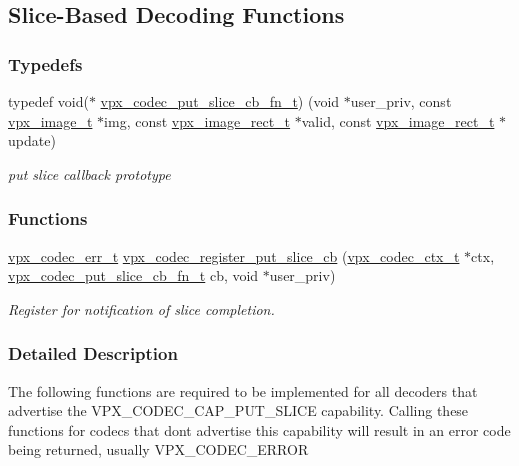 \hypertarget{group__cap__put__slice}{}\subsection{Slice-\/\+Based Decoding Functions}
\label{group__cap__put__slice}
\subsubsection*{Typedefs}
\begin{DoxyCompactItemize}
\item 
typedef void($\ast$ \hyperlink{group__cap__put__slice_gaab464940e2102efa0604b7788eb2e3b1}{vpx\+\_\+codec\+\_\+put\+\_\+slice\+\_\+cb\+\_\+fn\+\_\+t}) (void $\ast$user\+\_\+priv, const \hyperlink{vpx__image_8h_abf5ac962cc6d71b4f0e39b1b0d033e55}{vpx\+\_\+image\+\_\+t} $\ast$img, const \hyperlink{vpx__image_8h_aba8af9e601eb9c3c41431d0f4fef65a6}{vpx\+\_\+image\+\_\+rect\+\_\+t} $\ast$valid, const \hyperlink{vpx__image_8h_aba8af9e601eb9c3c41431d0f4fef65a6}{vpx\+\_\+image\+\_\+rect\+\_\+t} $\ast$update)
\begin{DoxyCompactList}\small\item\em put slice callback prototype \end{DoxyCompactList}\end{DoxyCompactItemize}
\subsubsection*{Functions}
\begin{DoxyCompactItemize}
\item 
\hyperlink{group__codec_gada1084710837ad363b92f2379dd2b8d2}{vpx\+\_\+codec\+\_\+err\+\_\+t} \hyperlink{group__cap__put__slice_gaffcc69a8134406fc653500759b696b8e}{vpx\+\_\+codec\+\_\+register\+\_\+put\+\_\+slice\+\_\+cb} (\hyperlink{group__codec_gad03e2dfa6ae511db7d25be6bbb336233}{vpx\+\_\+codec\+\_\+ctx\+\_\+t} $\ast$ctx, \hyperlink{group__cap__put__slice_gaab464940e2102efa0604b7788eb2e3b1}{vpx\+\_\+codec\+\_\+put\+\_\+slice\+\_\+cb\+\_\+fn\+\_\+t} cb, void $\ast$user\+\_\+priv)
\begin{DoxyCompactList}\small\item\em Register for notification of slice completion. \end{DoxyCompactList}\end{DoxyCompactItemize}


\subsubsection{Detailed Description}
The following functions are required to be implemented for all decoders that advertise the V\+P\+X\+\_\+\+C\+O\+D\+E\+C\+\_\+\+C\+A\+P\+\_\+\+P\+U\+T\+\_\+\+S\+L\+I\+CE capability. Calling these functions for codecs that don\textquotesingle{}t advertise this capability will result in an error code being returned, usually V\+P\+X\+\_\+\+C\+O\+D\+E\+C\+\_\+\+E\+R\+R\+OR 

